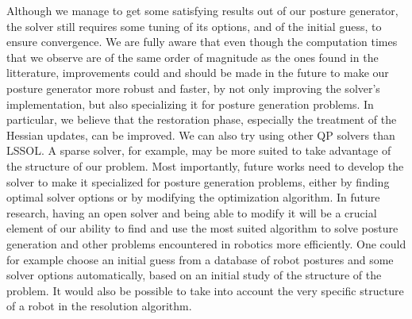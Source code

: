 Although we manage to get some satisfying results out of our posture generator, the solver still requires some tuning of its options, and of the initial guess, to ensure convergence.
We are fully aware that even though the computation times that we observe are of the same order of magnitude as the ones found in the litterature, improvements could and should be made in the future to make our posture generator more robust and faster, by not only improving the solver's implementation, but also specializing it for posture generation problems.
In particular, we believe that the restoration phase, especially the treatment of the Hessian updates, can be improved.
We can also try using other QP solvers than LSSOL.
A sparse solver, for example, may be more suited to take advantage of the structure of our problem.
Most importantly, future works need to develop the solver to make it specialized for posture generation problems, either by finding optimal solver options or by modifying the optimization algorithm.
In future research, having an open solver and being able to modify it will be a crucial element of our ability to find and use the most suited algorithm to solve posture generation and other problems encountered in robotics more efficiently.
One could for example choose an initial guess from a database of robot postures and some solver options automatically, based on an initial study of the structure of the problem.
It would also be possible to take into account the very specific structure of a robot in the resolution algorithm.


